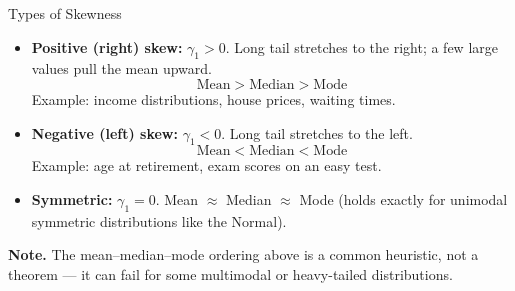 \documentclass[11pt,aspectratio=169]{beamer}
\newcommand{\Note}[1]{\textbf{Note.} #1}
\begin{document}
\begin{frame}{Types of Skewness}
\begin{itemize}
    \item \textbf{Positive (right) skew:} $\gamma_1>0$. Long tail stretches
          to the right; a few large values pull the mean upward.
    \[
        \text{Mean} > \text{Median} > \text{Mode}
    \]
    Example: income distributions, house prices, waiting times.

    \item \textbf{Negative (left) skew:} $\gamma_1<0$. Long tail stretches
          to the left.
    \[
        \text{Mean} < \text{Median} < \text{Mode}
    \]
    Example: age at retirement, exam scores on an easy test.

    \item \textbf{Symmetric:} $\gamma_1=0$. Mean $\approx$ Median
          $\approx$ Mode (holds exactly for unimodal symmetric
          distributions like the Normal).
\end{itemize}

\Note{The mean--median--mode ordering above is a common heuristic, not a
theorem — it can fail for some multimodal or heavy-tailed distributions.}
\end{frame}
\end{document}
